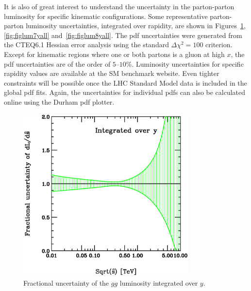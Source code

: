 \documentclass[12pt]{iopart}
\begin{document}
It is also of great interest to understand the uncertainty in the parton-parton luminosity for specific
kinematic configurations. Some representative parton-parton luminosity uncertainties, integrated  over
rapidity,  are shown in Figures~\ref{fig:figlum6yall}, \ref{fig:figlum7yall} and~\ref{fig:figlum8yall}. The pdf
uncertainties were generated from the CTEQ6.1 Hessian error analysis using the standard $\Delta \chi^2 = 100$
criterion. Except for kinematic  regions where one or both partons is a gluon at high $x$, the pdf uncertainties
are of  the order of $5$--$10\%$. Luminosity uncertainties for specific rapidity values are available at the SM
benchmark website. Even tighter constraints will be possible once the LHC Standard Model  data is included in
the global pdf fits. Again, the uncertainties for individual pdfs can also be calculated online using the
Durham pdf plotter. 
%
\begin{figure}[t]
\begin{center}
\includegraphics[width=9cm]{figlum6yall.ps}
\end{center}
\caption{
Fractional uncertainty of the $gg$ luminosity integrated over $y$. 
\label{fig:figlum6yall}
}
\end{figure}
%
%
\end{document}
